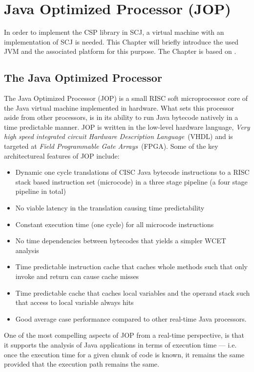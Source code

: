 \chapter{Java Optimized Processor (JOP)}
\label{chapter:jop}
In order to implement the CSP library in SCJ, a virtual machine with an implementation of SCJ is needed. This Chapter will briefly introduce the used JVM and the associated platform for this purpose. The Chapter is based on \cite{Schoeberl_ajava, JOPDesign, jop:handbook}.

\section{The Java Optimized Processor}
The Java Optimized Processor (JOP) is a small RISC soft microprocessor core of the Java virtual machine implemented in hardware. What sets this processor aside from other processors, is in its ability to run Java bytecode natively in a time predictable manner. JOP is written in the low-level hardware language, \textit{Very high speed integrated circuit Hardware Description Language}~(VHDL) and is targeted at \textit{Field Programmable Gate Arrays}~(FPGA). Some of the key architectureal features of JOP include:

\begin{itemize}
 	\item Dynamic one cycle translations of CISC Java bytecode instructions to a RISC stack based instruction set (microcode) in a three stage pipeline (a four stage pipeline in total)
 	\item No viable latency in the translation causing time predictability
 	\item Constant execution time (one cycle) for all microcode instructions
 	\item No time dependencies between bytecodes that yields a simpler WCET analysis
 	\item Time predictable instruction cache that caches whole methods such that only invoke and return can cause cache misses
 	\item Time predictable cache that caches local variables and the operand stack such that access to local variable always hits
 	\item Good average case performance compared to other real-time Java processors.
\end{itemize}
One of the most compelling aspects of JOP from a real-time perspective, is that it supports the analysis of Java applications in terms of execution time --- i.e. once the execution time for a given chunk of code is known, it remains the same provided that the execution path remains the same. 

